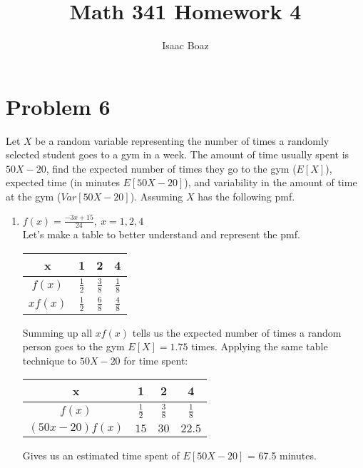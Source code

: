 \documentclass{article}
\title{Math 341 Homework 4}
\author{Isaac Boaz}
\begin{document}
\maketitle

\section*{Problem 6}
Let \(X\) be a random variable representing the number of times a randomly selected student goes to a gym in a week.
The amount of time usually spent is \(50X - 20\), find the expected number of times they go to the gym (\(E[X]\)), expected time (in minutes \(E[50X - 20]\)), and variability in the amount of time at the gym (\(Var[50X - 20]\)). Assuming \(X\) has the following pmf.
\begin{enumerate}[label = \alph*)]
    \item \(f(x) = \frac{-3x+15}{24},\ x = 1,2,4\) \\
          Let's make a table to better understand and represent the pmf.
          \begin{center}
              \begin{tabular}{c|ccc}
                  x         & 1               & 2               & 4               \\
                  \hline
                  \(f(x)\)  & \(\frac{1}{2}\) & \(\frac{3}{8}\) & \(\frac{1}{8}\) \\
                  \(xf(x)\) & \(\frac{1}{2}\) & \(\frac{6}{8}\) & \(\frac{4}{8}\)
              \end{tabular}
          \end{center}
          Summing up all \(xf(x)\) tells us the expected number of times a random person goes to the gym \(E[X] = 1.75\) times.
          Applying the same table technique to \(50X - 20\) for time spent:
          \begin{center}
              \begin{tabular}{c|ccc}
                  x                  & 1               & 2               & 4               \\
                  \hline
                  \(f(x)\)           & \(\frac{1}{2}\) & \(\frac{3}{8}\) & \(\frac{1}{8}\) \\
                  \((50x - 20)f(x)\) & \(15\)          & \(30\)          & \(22.5\)
              \end{tabular}
          \end{center}
          Gives us an estimated time spent of \(E[50X - 20]\) = 67.5 minutes.

\end{enumerate}
\end{document}
